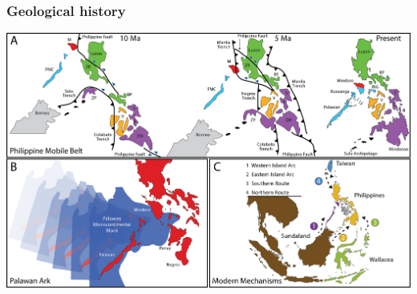 \begin{frame}[noframenumbering]
    \frametitle{Geological history}
    \includegraphics[width=\textwidth]{../images/maps/arees-fig3.png}
\end{frame}
    


